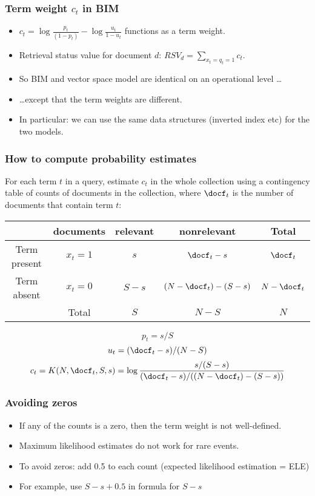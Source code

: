 \documentclass[compress]{beamer}
\def\myblue#1{\textcolor{texblue}{#1}}
\begin{document}
\begin{frame}[<+->]
\frametitle{Term weight $c_t$ in  BIM}
\pause[2]

\begin{itemize}
\item $c_t=\log \frac{p_t}{(1-p_t)} - \log \frac{u_t}{1-u_t}$ functions as a term
  weight.
\item Retrieval status value for document $d$: $RSV_d =
\sum_{x_t=q_t=1} c_t$.  
\item So BIM and vector space model are identical on an
  operational level \ldots
\item \ldots except that the term weights are different.
\item In particular: we can use the same data structures
  (inverted index etc) for the two models.
\end{itemize}
\end{frame}


\begin{frame}[<+->]
\frametitle{How to compute probability estimates}
\pause[2]

For each term $t$ in a query, estimate $c_t$ in the whole collection using a contingency table of counts of documents in the collection, where $\docf_t$ is the number of documents that contain term $t$:
%
\begin{tabular}[t]{|cc|cc|c|}
\hline
             & documents & relevant & nonrelevant & Total \\ \hline
Term present & $x_t = 1$ & $s$ & $\docf_t-s$ & $\docf_t$ \\
Term absent  & $x_t = 0$ & $S-s$ & $(N-\docf_t)-(S-s)$ & $N-\docf_t$ \\ \hline
             & Total & $S$ & $N-S$ & $N$ \\ \hline
\end{tabular}

%
\begin{equation}
\nonumber
 p_t = s/S  
\end{equation}
\begin{equation}
\nonumber
u_t = (\docf_t-s)/(N-S) 
\end{equation}
\begin{equation}
\nonumber
c_t = K(N,\docf_t,S,s) = \log\frac{s/(S-s)}{(\docf_t-s)/((N-\docf_t)-(S-s))}  
\end{equation}


\end{frame}

\begin{frame}[<+->]
\frametitle{Avoiding zeros}
\pause[2]

\begin{itemize}
\item If any of the counts is a zero, then the term weight is
  not well-defined.
\item Maximum likelihood estimates do not work for rare
  events.
\item To avoid zeros: \myblue{add 0.5 to each count}
  (expected likelihood estimation = ELE)
\item For example, use $S-s+0.5$ in formula for $S-s$
\end{itemize}

\end{frame}
\end{document}
